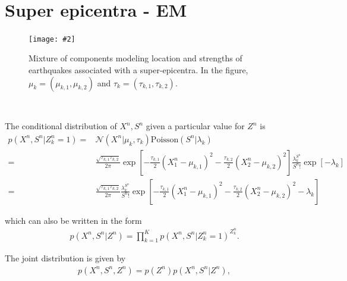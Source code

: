 \documentclass[11pt]{extarticle}
\newcommand{\N}{\mathcal{N}}
\newcommand{\0}{\mathbf{0}}
\renewcommand{\(}{\left(}
\renewcommand{\)}{\right)}
\theoremstyle{definition}
\newcommand{\image}[3]{
	\begin{figure}[!ht]
		\centering
	    \texttt{[image: \#2]}
		\caption{#3}
		\label{fig:#2}
	\end{figure}
}
\begin{document}
\noindent{} \\
\par 


\section{Super epicentra - EM}
\image{0.5}{Q2_2}{Mixture of components modeling location and strengths of earthquakes associated with a super-epicentra. In the figure, $\mu_{k} = (\mu_{k,1}, \mu_{k,2})$ and $\tau_{k} = (\tau_{k,1}, \tau_{k,2})$.}
\noindent{} \\
\par The conditional distribution of $X^{n}, S^{n}$ given a particular value for $Z^{n}$ is
\begin{align*}
	p(X^{n}, S^{n} \vert Z^{n}_{k}=1) =& \N(X^{n} \vert \mu_{k}, \tau_{k}) \mathrm{Poisson}(S^{n} \vert \lambda_{k}) \\ 
	=& \frac{\sqrt{\tau_{k,1}\tau_{k,2}}}{2\pi} \exp\left[-\frac{\tau_{k,1}}{2}(X^{n}_{1} - \mu_{k,1})^{2} - \frac{\tau_{k,2}}{2}(X^{n}_{2} - \mu_{k,2})^{2}\right] \frac{\lambda_{k}^{S^{n}}}{S^{n}!} \exp\left[-\lambda_{k}\right] \\
	=& \frac{\sqrt{\tau_{k,1}\tau_{k,2}}}{2\pi} \frac{\lambda_{k}^{S^{n}}}{S^{n}!} \exp\left[-\frac{\tau_{k,1}}{2}(X^{n}_{1} - \mu_{k,1})^{2} - \frac{\tau_{k,2}}{2}(X^{n}_{2} - \mu_{k,2})^{2} -\lambda_{k}\right]
\end{align*}
\par which can also be written in the form
\begin{align*}
	p(X^{n}, S^{n} \vert Z^{n}) = \prod_{k=1}^{K} p(X^{n}, S^{n} \vert Z^{n}_{k}=1)^{Z^{n}_{k}}.
\end{align*}
\par The joint distribution is given by
\begin{align*}
	p(X^{n}, S^{n}, Z^{n}) = p(Z^{n}) p(X^{n}, S^{n} \vert Z^{n}),
\end{align*}
\end{document}
